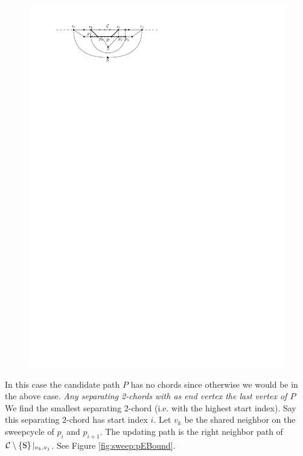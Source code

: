       \begin{figure}[h]
        \centering
        \includegraphics[scale=1]{unifiedAlgo/img/sweep/2chordInChordUpdate}
        \caption{}
        \label{fig:sweep:2chordInChordUpdate}
      \end{figure}

      In this case the candidate path $P$ has no chords since otherwise we would be in the above case.
    \emph{Any separating 2-chords with as end vertex the last vertex of $P$}
      We find the smallest separating 2-chord (i.e. with the highest start index). Say this separating $2$-chord has start index $i$.
      Let $v_k$ be the shared neighbor on the sweepcycle of $p_{i}$ and $p_{i +1}$. The updating path is the right neighbor path of $\mathcal{C} \setminus \left\lbrace {\mathrm{S}} \right\rbrace|_{v_k, v_j}$. See Figure \ref{fig:sweep:pEBound}.

